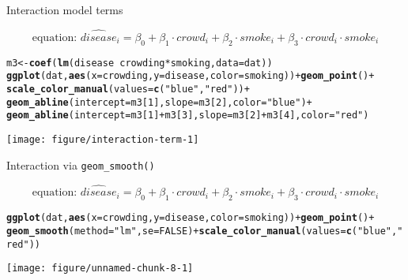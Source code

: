 \documentclass[table]{beamer}\usepackage[]{graphicx}\usepackage[]{color}
\makeatletter
\def\maxwidth{ %
  \ifdim\Gin@nat@width>\linewidth
    \linewidth
  \else
    \Gin@nat@width
  \fi
}
\newcommand{\hlnum}[1]{\textcolor[rgb]{0.686,0.059,0.569}{#1}}%
\newcommand{\hlstr}[1]{\textcolor[rgb]{0.192,0.494,0.8}{#1}}%
\newcommand{\hlopt}[1]{\textcolor[rgb]{0,0,0}{#1}}%
\newcommand{\hlstd}[1]{\textcolor[rgb]{0.345,0.345,0.345}{#1}}%
\newcommand{\hlkwb}[1]{\textcolor[rgb]{0.69,0.353,0.396}{#1}}%
\newcommand{\hlkwc}[1]{\textcolor[rgb]{0.333,0.667,0.333}{#1}}%
\newcommand{\hlkwd}[1]{\textcolor[rgb]{0.737,0.353,0.396}{\textbf{#1}}}%
\newenvironment{kframe}{%
 \def\at@end@of@kframe{}%
 \ifinner\ifhmode%
  \def\at@end@of@kframe{\end{minipage}}%
  \begin{minipage}{\columnwidth}%
 \fi\fi%
 \def\FrameCommand##1{\hskip\@totalleftmargin \hskip-\fboxsep
 \colorbox{shadecolor}{##1}\hskip-\fboxsep
     \hskip-\linewidth \hskip-\@totalleftmargin \hskip\columnwidth}%
 \MakeFramed {\advance\hsize-\width
   \@totalleftmargin\z@ \linewidth\hsize
   \@setminipage}}%
 {\par\unskip\endMakeFramed%
 \at@end@of@kframe}
\newenvironment{knitrout}{}{} %
\makeatother
\begin{document}
\begin{frame}[fragile]{Interaction model terms}

$$ \mbox{equation: \ }  \widehat{disease}_i = \beta_0 + \beta_1\cdot crowd_i + \beta_2\cdot smoke_i + \beta_3\cdot crowd_i \cdot smoke_i  $$

\begin{knitrout}\scriptsize
{}\color{fgcolor}\begin{kframe}
\begin{alltt}
\hlstd{m3} \hlkwb{<-} \hlkwd{coef}\hlstd{(}\hlkwd{lm}\hlstd{(disease} \hlopt{~} \hlstd{crowding}\hlopt{*}\hlstd{smoking,} \hlkwc{data}\hlstd{=dat))}
\hlkwd{ggplot}\hlstd{(dat,} \hlkwd{aes}\hlstd{(}\hlkwc{x}\hlstd{=crowding,} \hlkwc{y}\hlstd{=disease,} \hlkwc{color}\hlstd{=smoking))} \hlopt{+}  \hlkwd{geom_point}\hlstd{()} \hlopt{+}
  \hlkwd{scale_color_manual}\hlstd{(}\hlkwc{values} \hlstd{=} \hlkwd{c}\hlstd{(}\hlstr{"blue"}\hlstd{,} \hlstr{"red"}\hlstd{))} \hlopt{+}
  \hlkwd{geom_abline}\hlstd{(}\hlkwc{intercept} \hlstd{= m3[}\hlnum{1}\hlstd{],} \hlkwc{slope} \hlstd{= m3[}\hlnum{2}\hlstd{],} \hlkwc{color}\hlstd{=}\hlstr{"blue"}\hlstd{)} \hlopt{+}
  \hlkwd{geom_abline}\hlstd{(}\hlkwc{intercept} \hlstd{= m3[}\hlnum{1}\hlstd{]}\hlopt{+}\hlstd{m3[}\hlnum{3}\hlstd{],} \hlkwc{slope} \hlstd{= m3[}\hlnum{2}\hlstd{]}\hlopt{+}\hlstd{m3[}\hlnum{4}\hlstd{],} \hlkwc{color}\hlstd{=}\hlstr{"red"}\hlstd{)}
\end{alltt}
\end{kframe}
\texttt{[image: figure/interaction-term-1]} 
\end{knitrout}

\end{frame}



\begin{frame}[fragile]{Interaction via {\tt geom\_smooth()}}

$$ \mbox{equation: \ }  \widehat{disease}_i = \beta_0 + \beta_1\cdot crowd_i + \beta_2\cdot smoke_i + \beta_3\cdot crowd_i \cdot smoke_i  $$

\begin{knitrout}\scriptsize
{}\color{fgcolor}\begin{kframe}
\begin{alltt}
\hlkwd{ggplot}\hlstd{(dat,} \hlkwd{aes}\hlstd{(}\hlkwc{x}\hlstd{=crowding,} \hlkwc{y}\hlstd{=disease,} \hlkwc{color}\hlstd{=smoking))} \hlopt{+}  \hlkwd{geom_point}\hlstd{()} \hlopt{+}
  \hlkwd{geom_smooth}\hlstd{(}\hlkwc{method}\hlstd{=}\hlstr{"lm"}\hlstd{,} \hlkwc{se}\hlstd{=}\hlnum{FALSE}\hlstd{)} \hlopt{+} \hlkwd{scale_color_manual}\hlstd{(}\hlkwc{values} \hlstd{=} \hlkwd{c}\hlstd{(}\hlstr{"blue"}\hlstd{,} \hlstr{"red"}\hlstd{))}
\end{alltt}
\end{kframe}
\texttt{[image: figure/unnamed-chunk-8-1]} 
\end{knitrout}


\end{frame}
\end{document}
